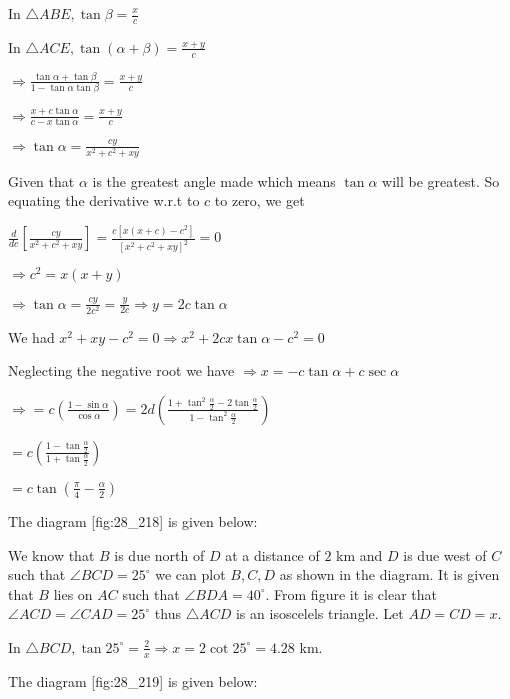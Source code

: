   In $\triangle ABE, \tan\beta = \frac{x}{c}$

  In $\triangle ACE, \tan(\alpha + \beta) = \frac{x + y}{c}$

  $\Rightarrow \frac{\tan\alpha + \tan\beta}{1 - \tan\alpha\tan\beta} = \frac{x + y}{c}$

  $\Rightarrow \frac{x + c\tan\alpha}{c - x\tan\alpha} = \frac{x + y}{c}$

  $\Rightarrow \tan\alpha = \frac{cy}{x^2 + c^2 + xy}$

  Given that $\alpha$ is the greatest angle made which means $\tan\alpha$ will be greatest. So
  equating the derivative w.r.t to $c$ to zero, we get

  $\frac{d}{dc}\left[\frac{cy}{x^2 + c^2 + xy}\right] = \frac{c[x(x + c) - c^2]}{[x^2 + c^2 +
      xy]^2} = 0$

  $\Rightarrow c^2 = x(x + y)$

  $\Rightarrow \tan\alpha = \frac{cy}{2c^2} = \frac{y}{2c} \Rightarrow y = 2c\tan\alpha$

  We had $x^2 + xy - c^2 = 0 \Rightarrow x^2 + 2cx\tan\alpha - c^2 = 0$

  Neglecting the negative root we have $\Rightarrow x = -c\tan\alpha + c\sec\alpha$

  $\Rightarrow = c\left(\frac{1 - \sin\alpha}{\cos\alpha}\right) = 2d\left(\frac{1 +
    \tan^2\frac{\alpha}{2} - 2\tan\frac{\alpha}{2}}{1 - \tan^2\frac{\alpha}{2}}\right)$

  $= c\left(\frac{1 - \tan\frac{\alpha}{2}}{1 + \tan\frac{\alpha}{2}}\right)$

  $= c\tan\left(\frac{\pi}{4} - \frac{\alpha}{2}\right)$

\item The diagram [fig:28_218] is given below:

  \startplacefigure[reference=fig:28_218]
    \externalfigure[28_218.pdf]
  \stopplacefigure

  We know that $B$ is due north of $D$ at a distance of $2$ km and $D$ is due
  west of $C$ such that $\angle BCD = 25^\circ$ we can plot $B, C, D$ as shown in the
  diagram. It is given that $B$ lies on $AC$ such that $\angle BDA = 40^\circ$. From
  figure it is clear that $\angle ACD = \angle CAD = 25^\circ$ thus $\triangle ACD$ is an
  isoscelels triangle. Let $AD = CD = x$.

  In $\triangle BCD, \tan25^\circ = \frac{2}{x} \Rightarrow x = 2\cot25^\circ = 4.28$ km.

\item The diagram [fig:28_219] is given below:

